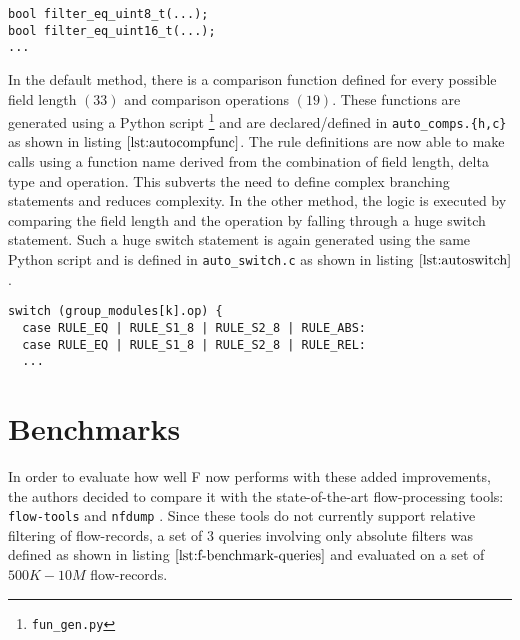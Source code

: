 \begin{lstlisting}
bool filter_eq_uint8_t(...);
bool filter_eq_uint16_t(...);
...
\end{lstlisting}

In the default method, there is a comparison function defined for every
possible field length $(33)$ and comparison operations $(19)$. These functions
are generated using a Python script \footnote{\texttt{fun\_gen.py}} and are
declared/defined in \texttt{auto\_comps.\{h,c\}} as shown in listing
$\ref{lst:autocompfunc}$. The rule definitions are now able to make calls
 using a function name derived from the combination of field length,
delta type and operation. This subverts the need to define complex branching
statements and reduces complexity. In the other method, the logic is executed
by comparing the field length and the operation by falling through a huge
switch statement.  Such a huge switch statement is again generated using the
same Python script and is defined in \texttt{auto\_switch.c} as shown in
listing $\ref{lst:autoswitch}$.


\begin{lstlisting}
switch (group_modules[k].op) {
  case RULE_EQ | RULE_S1_8 | RULE_S2_8 | RULE_ABS:
  case RULE_EQ | RULE_S1_8 | RULE_S2_8 | RULE_REL:
  ...
\end{lstlisting}

\section{Benchmarks}\label{sec:f-benchmarks}
In order to evaluate how well F now performs with these added improvements,
the authors decided to compare it with the state-of-the-art flow-processing
tools: \texttt{flow-tools} \cite{sromig:2000} and \texttt{nfdump}
\cite{phaag:2006}. Since these  tools
do not currently support relative filtering of flow-records, a set of $3$
queries involving only absolute filters was defined as shown in listing
$\ref{lst:f-benchmark-queries}$ and evaluated on a set of $500K-10M$
flow-records.

